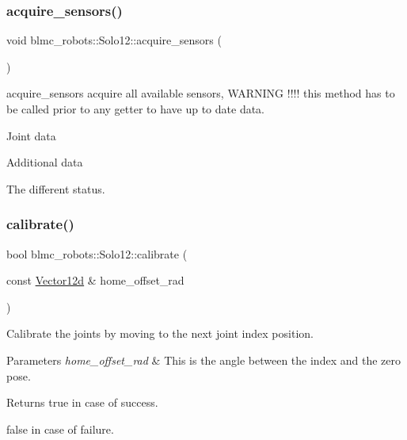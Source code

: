 \subsubsection{\texorpdfstring{acquire\+\_\+sensors()}{acquire\_sensors()}}
{\footnotesize\ttfamily void blmc\+\_\+robots\+::\+Solo12\+::acquire\+\_\+sensors (\begin{DoxyParamCaption}{ }\end{DoxyParamCaption})}



acquire\+\_\+sensors acquire all available sensors, W\+A\+R\+N\+I\+NG !!!! this method has to be called prior to any getter to have up to date data. 

Joint data

Additional data

The different status.\mbox{\label{classblmc__robots_1_1Solo12_a8b9bfe0950a5d54ea5528aa98204f651}} 
\subsubsection{\texorpdfstring{calibrate()}{calibrate()}}
{\footnotesize\ttfamily bool blmc\+\_\+robots\+::\+Solo12\+::calibrate (\begin{DoxyParamCaption}\item[{const \hyperlink{common__header_8hpp_a80313eb420184518596e745eecf4b494}{Vector12d} \&}]{home\+\_\+offset\+\_\+rad }\end{DoxyParamCaption})}



Calibrate the joints by moving to the next joint index position. 


\begin{DoxyParams}{Parameters}
{\em home\+\_\+offset\+\_\+rad} & This is the angle between the index and the zero pose. \\
\hline
\end{DoxyParams}
\begin{DoxyReturn}{Returns}
true in case of success. 

false in case of failure. 
\end{DoxyReturn}
\mbox{\label{classblmc__robots_1_1Solo12_a79d74e1bbae286d8d79a94e328d3ad00}} 
